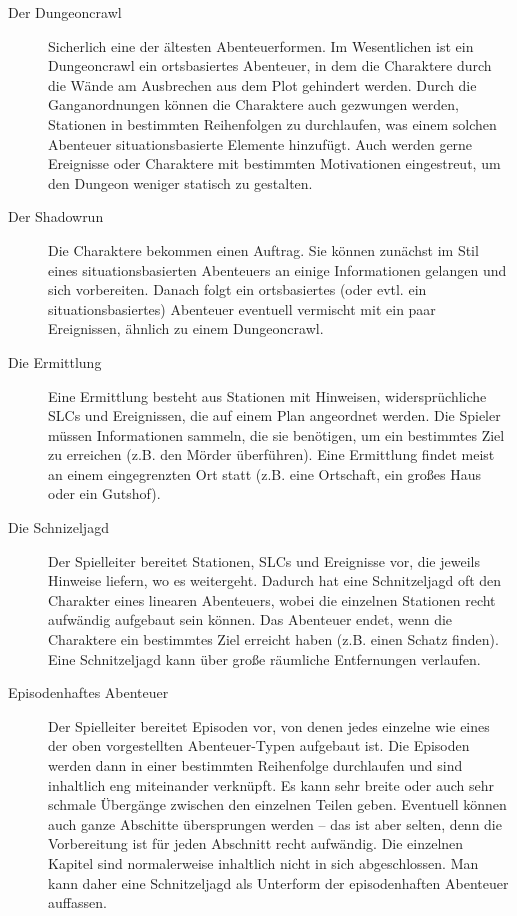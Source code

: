 \begin{description}
\item[Der Dungeoncrawl]
    Sicherlich eine der ältesten Abenteuerformen. Im Wesentlichen ist ein
    Dungeoncrawl ein ortsbasiertes Abenteuer, in dem die Charaktere durch die
    Wände am Ausbrechen aus dem Plot gehindert werden. Durch die
    Ganganordnungen können die Charaktere auch gezwungen werden, Stationen in
    bestimmten Reihenfolgen zu durchlaufen, was einem solchen Abenteuer
    situationsbasierte Elemente hinzufügt. Auch werden gerne Ereignisse oder
    Charaktere mit bestimmten Motivationen eingestreut, um den Dungeon weniger
    statisch zu gestalten.

\item[Der Shadowrun]
    Die Charaktere bekommen einen Auftrag. Sie können zunächst im Stil eines
    situationsbasierten Abenteuers an einige Informationen gelangen und sich
    vorbereiten. Danach folgt ein ortsbasiertes (oder evtl. ein
    situationsbasiertes) Abenteuer eventuell vermischt mit ein paar
    Ereignissen, ähnlich zu einem Dungeoncrawl.

\item[Die Ermittlung]
    Eine Ermittlung besteht aus Stationen mit Hinweisen, widersprüchliche SLCs
    und Ereignissen, die auf einem Plan angeordnet werden. Die Spieler müssen
    Informationen sammeln, die sie benötigen, um ein bestimmtes Ziel zu
    erreichen (z.B. den Mörder überführen). Eine Ermittlung findet meist an
    einem eingegrenzten Ort statt (z.B. eine Ortschaft, ein großes Haus oder
    ein Gutshof).

\item[Die Schnizeljagd]
    Der Spielleiter bereitet Stationen, SLCs und Ereignisse vor, die jeweils
    Hinweise liefern, wo es weitergeht. Dadurch hat eine Schnitzeljagd oft den
    Charakter eines linearen Abenteuers, wobei die einzelnen Stationen
    recht aufwändig aufgebaut sein können. Das Abenteuer endet, wenn die
    Charaktere ein bestimmtes Ziel erreicht haben (z.B. einen Schatz finden).
    Eine Schnitzeljagd kann über große räumliche Entfernungen verlaufen.

\item[Episodenhaftes Abenteuer]
    Der Spielleiter bereitet Episoden vor, von denen jedes einzelne wie eines
    der oben vorgestellten Abenteuer-Typen aufgebaut ist. Die Episoden werden
    dann in einer bestimmten Reihenfolge durchlaufen und sind inhaltlich eng
    miteinander verknüpft. Es kann sehr breite oder auch sehr schmale Übergänge
    zwischen den einzelnen Teilen geben. Eventuell können auch ganze Abschitte
    übersprungen werden -- das ist aber selten, denn die Vorbereitung ist für
    jeden Abschnitt recht aufwändig. Die einzelnen Kapitel sind normalerweise
    inhaltlich nicht in sich abgeschlossen. Man kann daher eine Schnitzeljagd
    als Unterform der episodenhaften Abenteuer auffassen.


\end{description}
